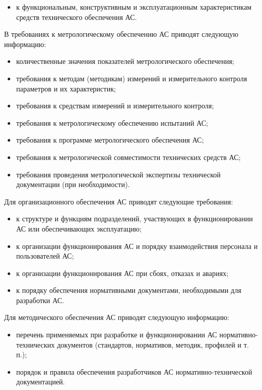 {\begin{itemize}
  \item к функциональным, конструктивным и эксплуатационным характеристикам средств технического обеспечения АС.
\end{itemize}
В требованиях к метрологическому обеспечению АС приводят следующую информацию:
\begin{itemize}
  \item количественные значения показателей метрологического обеспечения;
  \item требования к методам (методикам) измерений и измерительного контроля параметров и их характеристик;
  \item требования к средствам измерений и измерительного контроля;
  \item требования к метрологическому обеспечению испытаний АС;
  \item требования к программе метрологического обеспечения АС;
  \item требования к метрологической совместимости технических средств АС;
  \item требования проведения метрологической экспертизы технической документации (при необходимости).
\end{itemize}
Для организационного обеспечения АС приводят следующие требования:
\begin{itemize}
  \item к структуре и функциям подразделений, участвующих в функционировании АС или обеспечивающих эксплуатацию;
  \item к организации функционирования АС и порядку взаимодействия персонала и пользователей АС;
  \item к организации функционирования АС при сбоях, отказах и авариях;
  \item к порядку обеспечения нормативными документами, необходимыми для разработки АС.
\end{itemize}
Для методического обеспечения АС приводят следующую информацию:
\begin{itemize}
  \item перечень применяемых при разработке и функционировании АС нормативно-технических документов (стандартов, нормативов, методик, профилей и т. п.);
  \item порядок и правила обеспечения разработчиков АС нормативно-технической документацией.
\end{itemize}
}
